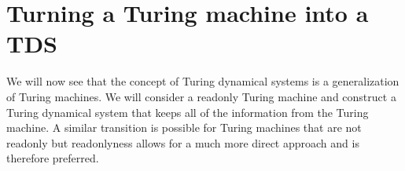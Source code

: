 \section{Turning a Turing machine into a TDS} \label{tm_to_tds}

We will now see that the concept of Turing dynamical systems is a generalization of Turing machines.
We will consider a readonly Turing machine and construct a Turing dynamical system that keeps all of the information from the Turing machine.
A similar transition is possible for Turing machines that are not readonly but readonlyness allows for a much more direct approach and is therefore preferred.



